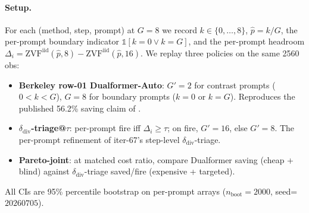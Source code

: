 \documentclass{article}
\begin{document}
\paragraph{Setup.}
For each (method, step, prompt) at $G{=}8$ we record
$k \in \{0,\ldots,8\}$, $\hat{p}{=}k/G$, the per-prompt boundary
indicator $\mathbb{1}[k{=}0 \vee k{=}G]$, and the per-prompt headroom
$\Delta_i = \mathrm{ZVF}^{\mathrm{iid}}(\hat{p}, 8) -
\mathrm{ZVF}^{\mathrm{iid}}(\hat{p}, 16)$.
We replay three policies on the same 2560 obs:
\begin{itemize}
    \item \textbf{Berkeley row-01 Dualformer-Auto}:
        $G'{=}2$ for contrast prompts ($0 < k < G$), $G{=}8$ for
        boundary prompts ($k{=}0$ or $k{=}G$). Reproduces the
        published 56.2\% saving claim of
        \citet{su2024dualformer}.
    \item \textbf{$\delta_{\mathrm{div}}$-triage@$\tau$}:
        per-prompt fire iff $\Delta_i \geq \tau$; on fire,
        $G'{=}16$, else $G'{=}8$. The per-prompt refinement
        of iter-67's step-level $\delta_{\mathrm{div}}$-triage.
    \item \textbf{Pareto-joint}:
        at matched cost ratio, compare Dualformer saving
        (cheap + blind) against $\delta_{\mathrm{div}}$-triage
        saved/fire (expensive + targeted).
\end{itemize}
All CIs are 95\% percentile bootstrap on per-prompt arrays
($n_{\mathrm{boot}}{=}2000$, seed=$20260705$).
\end{document}
